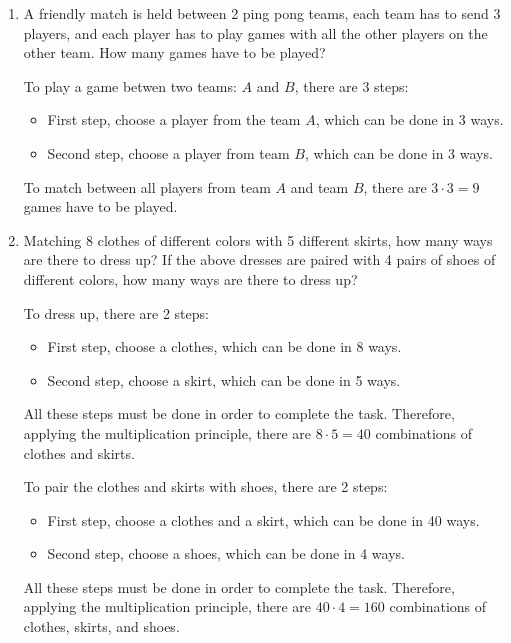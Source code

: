 \documentclass{report}
\begin{document}
\begin{multicols}{2}
\begin{enumerate}
    \item A friendly match is held between 2 ping pong teams, each team has to send 3
          players, and each player has to play games with all the other players on the
          other team. How many games have to be played? \sol{}

          To play a game betwen two teams: $A$ and $B$, there are 3 steps:
          \begin{itemize}
            \item First step, choose a player from the team $A$, which can be done in 3 ways.
            \item Second step, choose a player from team $B$, which can be done in 3 ways.
          \end{itemize}
          To match between all players from team $A$ and team $B$, there are $3 \cdot 3 = 9$ games have to be played.

    \item Matching 8 clothes of different colors with 5 different skirts, how many ways
          are there to dress up? If the above dresses are paired with 4 pairs of shoes of
          different colors, how many ways are there to dress up? \sol{}

          To dress up, there are 2 steps:
          \begin{itemize}
            \item First step, choose a clothes, which can be done in 8 ways.
            \item Second step, choose a skirt, which can be done in 5 ways.
          \end{itemize}
          All these steps must be done in order to complete the task. Therefore, applying the multiplication principle, there are $8 \cdot 5 = 40$ combinations of clothes and skirts.

          To pair the clothes and skirts with shoes, there are 2 steps:
          \begin{itemize}
            \item First step, choose a clothes and a skirt, which can be done in 40 ways.
            \item Second step, choose a shoes, which can be done in 4 ways.
          \end{itemize}
          All these steps must be done in order to complete the task. Therefore, applying the multiplication principle, there are $40 \cdot 4 = 160$ combinations of clothes, skirts, and shoes.

  \end{enumerate}


\end{multicols}
\end{document}
